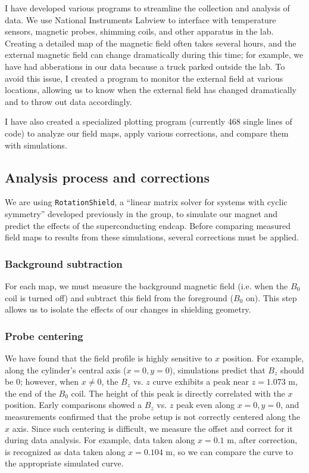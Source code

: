 \documentclass[twocolumn,aps,prb,citeautoscript]{revtex4-1}
\begin{document}
I have developed various programs to streamline the collection and analysis of data.
We use National Instruments Labview to interface with temperature sensors, magnetic probes, shimming coils,
and other apparatus in the lab. Creating a detailed map of the magnetic field often takes several hours,
and the external magnetic field
can change dramatically during this time; for example, we have had abberations in our data because a truck
parked outside the lab. To avoid this issue, I created a program to monitor the external field at various
locations, allowing us to know when the external field has changed dramatically and to throw out data accordingly.

I have also created a specialized plotting program (currently 468 single lines of code) to analyze
our field maps, apply various corrections, and compare them with simulations.

\subsection{Analysis process and corrections}

We are using \texttt{RotationShield}, a ``linear matrix solver for systems with cyclic symmetry'' developed previously in the group, \cite{rotshield}
to simulate our magnet and predict the effects of the superconducting endcap. Before comparing measured field maps
to results from these simulations, several corrections must be applied.

\subsubsection{Background subtraction}

For each map, we must measure the background magnetic field (i.e. when the $B_0$ coil is turned off) and
subtract this field from the foreground ($B_0$ on). This step allows us to isolate the effects of our changes in
shielding geometry.

\subsubsection{Probe centering}

We have found that the field profile is highly sensitive to $x$ position. For example, along the cylinder's
central axis ($x=0, y=0$), simulations predict that $B_z$ should be 0; however, when $x\neq0$,
the $B_z$ vs. $z$ curve exhibits
a peak near $z=1.073$ m, the end of the $B_0$ coil. The height of this peak is directly correlated with the $x$
position. Early comparisons showed a $B_z$ vs. $z$ peak even along $x=0, y=0$, and measurements confirmed that
the probe setup is not correctly centered along the $x$ axis. Since such centering is difficult, we measure the
offset and correct for it during data analysis. For example, data taken along $x = 0.1$ m, after correction,
is recognized as data taken along $x = 0.104$ m, so we can compare the curve to the appropriate simulated curve.
\end{document}
